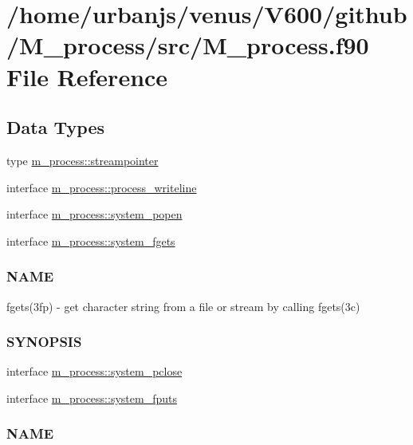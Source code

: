 \hypertarget{M__process_8f90}{}\section{/home/urbanjs/venus/\+V600/github/\+M\+\_\+process/src/\+M\+\_\+process.f90 File Reference}
\label{M__process_8f90}
\subsection*{Data Types}
\begin{DoxyCompactItemize}
\item 
type \mbox{\hyperlink{structm__process_1_1streampointer}{m\+\_\+process\+::streampointer}}
\item 
interface \mbox{\hyperlink{interfacem__process_1_1process__writeline}{m\+\_\+process\+::process\+\_\+writeline}}
\item 
interface \mbox{\hyperlink{interfacem__process_1_1system__popen}{m\+\_\+process\+::system\+\_\+popen}}
\item 
interface \mbox{\hyperlink{interfacem__process_1_1system__fgets}{m\+\_\+process\+::system\+\_\+fgets}}
\begin{DoxyCompactList}\small\item\em \subsubsection*{N\+A\+ME}

fgets(3fp) -\/ get character string from a file or stream by calling fgets(3c) \subsubsection*{S\+Y\+N\+O\+P\+S\+IS}\end{DoxyCompactList}\item 
interface \mbox{\hyperlink{interfacem__process_1_1system__pclose}{m\+\_\+process\+::system\+\_\+pclose}}
\item 
interface \mbox{\hyperlink{interfacem__process_1_1system__fputs}{m\+\_\+process\+::system\+\_\+fputs}}
\begin{DoxyCompactList}\small\item\em \subsubsection*{N\+A\+ME}


\end{DoxyCompactList}
\end{DoxyCompactItemize}
